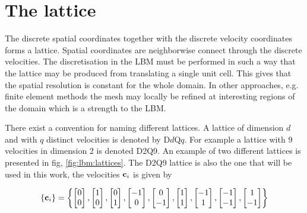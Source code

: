 \section{The lattice}\label{sec:lbm:lattice}
The discrete spatial coordinates together with the discrete velocity
coordinates forms a lattice. Spatial coordinates are neighborwise
connect through the discrete velocities. The discretisation in the LBM
must be performed in such a way that the lattice may be produced from
translating a single unit cell. This gives that the spatial resolution
is constant for the whole domain. In other approaches, e.g. finite
element methods the mesh may locally be refined at interesting regions
of the domain which is a strength to the LBM.  

There exist a convention for naming different lattices. A lattice of
dimension $d$ and with $q$ distinct velocities is denoted by
D$d$Q$q$. For example a lattice with 9 velocities in dimension 2 is
denoted D2Q9. An example of two different lattices is presented in
fig, \ref{fig:lbm:lattices}. The D2Q9 lattice is also the one that
will be used in this work, the velocities $\mathbf{c}_i$ is given by

\begin{equation}\label{eq:lbm:d2q9_c}
\{\mathbf{c}_i\} = \left\{
\begin{bmatrix}0\\0\end{bmatrix}, 
\begin{bmatrix}1\\0\end{bmatrix}, 
\begin{bmatrix}0\\1\end{bmatrix}, 
\begin{bmatrix}-1\\0\end{bmatrix}, 
\begin{bmatrix}0\\-1\end{bmatrix}, 
\begin{bmatrix}1\\1\end{bmatrix}, 
\begin{bmatrix}-1\\1\end{bmatrix}, 
\begin{bmatrix}-1\\-1\end{bmatrix}, 
\begin{bmatrix}1\\-1\end{bmatrix}
\right\} 
\end{equation}


